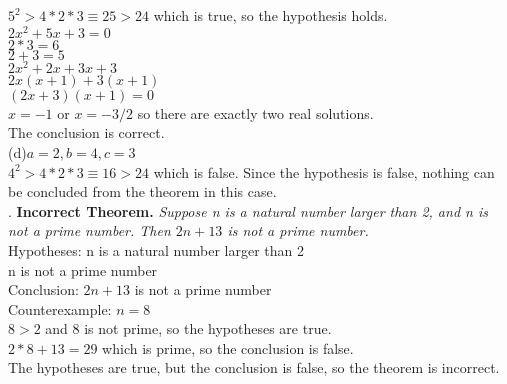 \documentclass{article}
\begin{document}
 $5^2 > 4 * 2 * 3 \equiv 25 > 24$ which is true, so the hypothesis holds. \\
 $2x^2 + 5x + 3 = 0$\\
 $2 * 3 = 6$\\
 $2 + 3 = 5$\\
 $2x^2 + 2x + 3x + 3$\\
 $2x(x + 1) + 3 (x + 1)$\\
 $(2x + 3)(x + 1) = 0$\\
 $x = -1$ or $x = -3/2$ so there are exactly two real solutions.\\ 
 The conclusion is correct.\\
 \linebreak
 (d)$a = 2, b = 4, c = 3$\\
 $4^2 > 4 * 2 * 3 \equiv 16 > 24$ which is false. Since the hypothesis is false, nothing can be concluded from the theorem in this case.\\
 . \textbf{Incorrect Theorem.} \textit{Suppose n is a natural number larger than 2, and n is not a prime number. Then $2n + 13$ is not a prime number. }\\
 Hypotheses: n is a natural number larger than 2\\
             n is not a prime number\\
 Conclusion: $2n + 13$ is not a prime number\\
 Counterexample: $n = 8$\\
 $8 > 2$ and 8 is not prime, so the hypotheses are true.\\
 $2 * 8 + 13 = 29$ which is prime, so the conclusion is false.\\
 The hypotheses are true, but the conclusion is false, so the theorem is incorrect.\\
\end{document}
